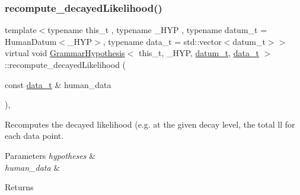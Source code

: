 \subsubsection{\texorpdfstring{recompute\+\_\+decayed\+Likelihood()}{recompute\_decayedLikelihood()}}
{\footnotesize\ttfamily template$<$typename this\+\_\+t , typename \+\_\+\+H\+YP , typename datum\+\_\+t  = Human\+Datum$<$\+\_\+\+H\+Y\+P$>$, typename data\+\_\+t  = std\+::vector$<$datum\+\_\+t$>$$>$ \\
virtual void \hyperlink{class_grammar_hypothesis}{Grammar\+Hypothesis}$<$ this\+\_\+t, \+\_\+\+H\+YP, \hyperlink{class_bayesable_a9f1a6c0cd7855550fa10b1a8f13a5867}{datum\+\_\+t}, \hyperlink{class_bayesable_aa2788c4d7718c0a824e1d28c4c98f921}{data\+\_\+t} $>$\+::recompute\+\_\+decayed\+Likelihood (\begin{DoxyParamCaption}\item[{const \hyperlink{class_bayesable_aa2788c4d7718c0a824e1d28c4c98f921}{data\+\_\+t} \&}]{human\+\_\+data }\end{DoxyParamCaption})\hspace{0.3cm}{\ttfamily [inline]}, {\ttfamily [virtual]}}



Recomputes the decayed likelihood (e.\+g. at the given decay level, the total ll for each data point. 


\begin{DoxyParams}{Parameters}
{\em hypotheses} & \\
\hline
{\em human\+\_\+data} & \\
\hline
\end{DoxyParams}
\begin{DoxyReturn}{Returns}

\end{DoxyReturn}
\mbox{\label{class_grammar_hypothesis_aa55913a4798b21974f225ec40193cfc1}} 
